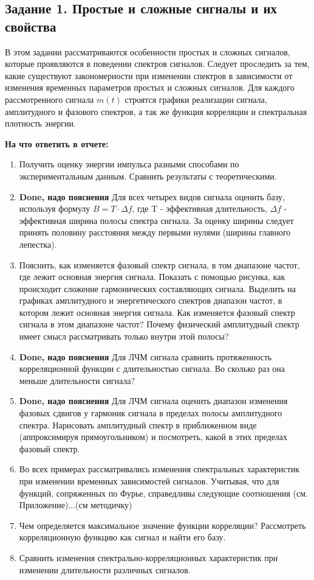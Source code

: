 \subsection{Задание 1. Простые и сложные сигналы и их свойства}
В этом задании рассматриваются особенности простых и сложных
сигналов, которые проявляются в поведении спектров сигналов. Следует
проследить за тем, какие существуют закономерности при изменении спектров
в зависимости от изменения временных параметров простых и сложных
сигналов.
Для каждого рассмотренного сигнала $m(t)$ строятся графики реализации
сигнала, амплитудного и фазового спектров, а так же функция корреляции и
спектральная плотность энергии.

\textbf{На что ответить в отчете:}
\begin{enumerate}
    \item Получить оценку энергии импульса разными способами по
    экспериментальным данным. Сравнить результаты с
    теоретическими.
    \item \textbf{Done, надо пояснения} Для всех четырех видов сигнала оценить базу,
    используя формулу
    $B=T \cdot \Delta f$, где T - эффективная длительность, $\Delta f$ - эффективная
    ширина полосы спектра сигнала. За оценку ширины следует
    принять половину расстояния между первыми нулями (ширины
    главного лепестка).
    \item Пояснить, как изменяется фазовый спектр сигнала, в том диапазоне
    частот, где лежит основная энергия сигнала. Показать с помощью
    рисунка, как происходит сложение гармонических составляющих
    сигнала. Выделить на графиках амплитудного и энергетического
    спектров диапазон частот, в котором лежит основная энергия
    сигнала. Как изменяется фазовый спектр сигнала в этом диапазоне
    частот? Почему физический амплитудный спектр имеет смысл
    рассматривать только внутри этой полосы?
    \item \textbf{Done, надо пояснения} Для ЛЧМ сигнала сравнить протяженность корреляционной
    функции с длительностью сигнала. Во сколько раз она меньше
    длительности сигнала?
    \item \textbf{Done, надо пояснения} Для ЛЧМ сигнала оценить диапазон изменения фазовых сдвигов у
    гармоник сигнала в пределах полосы амплитудного спектра.
    Нарисовать амплитудный спектр в приближенном виде
    (аппроксимируя прямоугольником) и посмотреть, какой в этих
    пределах фазовый спектр.
    \item Во всех примерах рассматривались изменения спектральных
    характеристик при изменении временных зависимостей сигналов.
    Учитывая, что для функций, сопряженных по Фурье, справедливы
    следующие соотношения (см. Приложение)...(см методичку)
    \item Чем определяется максимальное значение функции корреляции?
    Рассмотреть корреляционную функцию как сигнал и найти его базу.
    \item Сравнить изменения спектрально-корреляционных характеристик
    при изменении длительности различных сигналов.
\end{enumerate}


